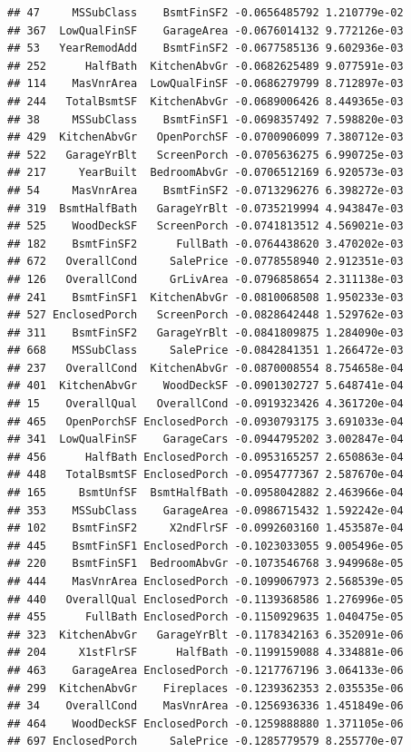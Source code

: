 \documentclass[american,]{article}
\theoremstyle{definition}
\theoremstyle{definition}
\theoremstyle{definition}
\theoremstyle{remark}
\begin{document}
\begin{verbatim}
## 47     MSSubClass    BsmtFinSF2 -0.0656485792 1.210779e-02
## 367  LowQualFinSF    GarageArea -0.0676014132 9.772126e-03
## 53   YearRemodAdd    BsmtFinSF2 -0.0677585136 9.602936e-03
## 252      HalfBath  KitchenAbvGr -0.0682625489 9.077591e-03
## 114    MasVnrArea  LowQualFinSF -0.0686279799 8.712897e-03
## 244   TotalBsmtSF  KitchenAbvGr -0.0689006426 8.449365e-03
## 38     MSSubClass    BsmtFinSF1 -0.0698357492 7.598820e-03
## 429  KitchenAbvGr   OpenPorchSF -0.0700906099 7.380712e-03
## 522   GarageYrBlt   ScreenPorch -0.0705636275 6.990725e-03
## 217     YearBuilt  BedroomAbvGr -0.0706512169 6.920573e-03
## 54     MasVnrArea    BsmtFinSF2 -0.0713296276 6.398272e-03
## 319  BsmtHalfBath   GarageYrBlt -0.0735219994 4.943847e-03
## 525    WoodDeckSF   ScreenPorch -0.0741813512 4.569021e-03
## 182    BsmtFinSF2      FullBath -0.0764438620 3.470202e-03
## 672   OverallCond     SalePrice -0.0778558940 2.912351e-03
## 126   OverallCond     GrLivArea -0.0796858654 2.311138e-03
## 241    BsmtFinSF1  KitchenAbvGr -0.0810068508 1.950233e-03
## 527 EnclosedPorch   ScreenPorch -0.0828642448 1.529762e-03
## 311    BsmtFinSF2   GarageYrBlt -0.0841809875 1.284090e-03
## 668    MSSubClass     SalePrice -0.0842841351 1.266472e-03
## 237   OverallCond  KitchenAbvGr -0.0870008554 8.754658e-04
## 401  KitchenAbvGr    WoodDeckSF -0.0901302727 5.648741e-04
## 15    OverallQual   OverallCond -0.0919323426 4.361720e-04
## 465   OpenPorchSF EnclosedPorch -0.0930793175 3.691033e-04
## 341  LowQualFinSF    GarageCars -0.0944795202 3.002847e-04
## 456      HalfBath EnclosedPorch -0.0953165257 2.650863e-04
## 448   TotalBsmtSF EnclosedPorch -0.0954777367 2.587670e-04
## 165     BsmtUnfSF  BsmtHalfBath -0.0958042882 2.463966e-04
## 353    MSSubClass    GarageArea -0.0986715432 1.592242e-04
## 102    BsmtFinSF2     X2ndFlrSF -0.0992603160 1.453587e-04
## 445    BsmtFinSF1 EnclosedPorch -0.1023033055 9.005496e-05
## 220    BsmtFinSF1  BedroomAbvGr -0.1073546768 3.949968e-05
## 444    MasVnrArea EnclosedPorch -0.1099067973 2.568539e-05
## 440   OverallQual EnclosedPorch -0.1139368586 1.276996e-05
## 455      FullBath EnclosedPorch -0.1150929635 1.040475e-05
## 323  KitchenAbvGr   GarageYrBlt -0.1178342163 6.352091e-06
## 204     X1stFlrSF      HalfBath -0.1199159088 4.334881e-06
## 463    GarageArea EnclosedPorch -0.1217767196 3.064133e-06
## 299  KitchenAbvGr    Fireplaces -0.1239362353 2.035535e-06
## 34    OverallCond    MasVnrArea -0.1256936336 1.451849e-06
## 464    WoodDeckSF EnclosedPorch -0.1259888880 1.371105e-06
## 697 EnclosedPorch     SalePrice -0.1285779579 8.255770e-07

\end{verbatim}
\end{document}
